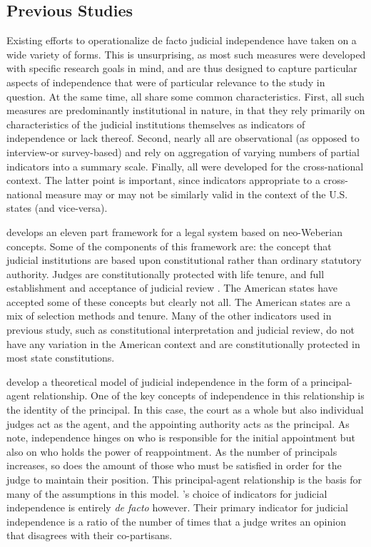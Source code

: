 \documentclass[JohnsonMADraft2.tex]{subfiles}
\begin{document}
\subsection*{Previous Studies}%
Existing efforts to operationalize de facto judicial independence have taken on a wide variety of forms. This is unsurprising, as most such measures were developed with specific research goals in mind, and are thus designed to capture particular aspects of independence that were of particular relevance to the study in question. At the same time, all share some common characteristics. First, all such measures are predominantly institutional in nature, in that they rely primarily on characteristics of the judicial institutions themselves as indicators of independence or lack thereof. Second, nearly all are observational (as opposed to interview-or survey-based) and rely on aggregation of varying numbers of partial indicators into a 
summary scale. Finally, all were developed for the cross-national context. The latter point is important, since indicators appropriate to a cross-national measure may or may not be similarly valid in the context of the U.S. states (and vice-versa).

\citet{Schmidhauser1987} develops an eleven part framework for a legal system based on neo-Weberian concepts.  Some of the components of this framework are: the concept that judicial institutions are based upon constitutional rather than ordinary statutory authority\citep{Schmidhauser1978}.  Judges are constitutionally protected with life tenure, and full establishment and acceptance of judicial review \citep[46-47]{Schmidhauser1987}.  The American states have accepted some of these concepts but clearly not all.  The American states are a mix of selection methods and tenure.  Many of the other indicators used in previous study, such as constitutional interpretation and judicial review, do not have any variation in the American context and are constitutionally protected in most state constitutions. 

develop a theoretical model of judicial independence in the form of a principal-agent relationship.  One of the key concepts of independence in this relationship is the identity of the principal.  In this case, the court as a whole but also individual judges act as the agent, and the appointing authority acts as the principal.  As \citeauthor{Choi2010} note, independence hinges on who is responsible for the initial appointment but also on who holds the power of reappointment.  As the number of principals increases, so does the amount of those who must be satisfied in order for the judge to maintain their position.  This principal-agent relationship is the basis for many of the assumptions in this model.  \citet{Choi2010}'s choice of indicators for judicial independence is entirely \textit{de facto} however.  Their primary indicator for judicial independence is a ratio of the number of times that a judge writes an opinion that disagrees with their co-partisans.
\end{document}
